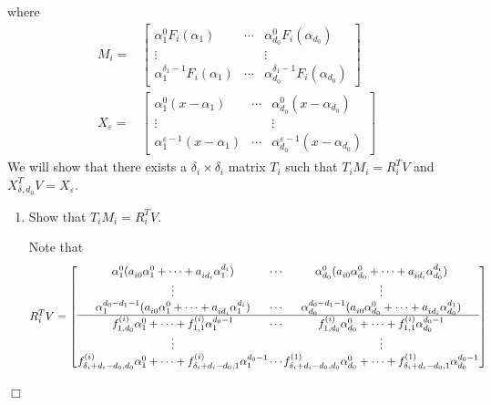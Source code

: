 \documentclass{article}
\newenvironment{proof}{\noindent{\em Proof:}}{$\Box$~\\}
\begin{document}
\begin{proof}
where
\begin{align*}
M_i=&
\begin{bmatrix}
{\alpha _1^0{F_i}({\alpha _1})}& \cdots &{\alpha _{{d_0}}^0{F_i}({\alpha _{{d_0}}})}\\
 \vdots &  & \vdots \\
{\alpha _1^{{\delta _1} - 1}{F_i}({\alpha _1})}& \cdots &{\alpha _{{d_0}}^{{\delta _1} - 1}{F_i}({\alpha _{{d_0}}})}
\end{bmatrix}\\
X_{\varepsilon}=&
\begin{bmatrix}
{\alpha _1^0(x - {\alpha _1})}& \cdots &{\alpha _{{d_0}}^0(x - {\alpha _{{d_0}}})}\\
 \vdots &  & \vdots \\
{\alpha _1^{\varepsilon  - 1}(x - {\alpha _1})}& \cdots &{\alpha _{{d_0}}^{\varepsilon  - 1}(x - {\alpha _{{d_0}}})}
\end{bmatrix}
\end{align*}
We will show that there exists a $\delta_i\times \delta_i$ matrix $T_i$ such that $T_iM_i=R_i^TV$ and
$X_{\delta,d_0}^TV=X_{\varepsilon}$.

\begin{enumerate}
\item Show that $T_iM_i=R_i^TV$.

Note that
{\scriptsize
\[
R_i^TV
\setlength{\arraycolsep}{0.5pt}
= \left[ {\begin{array}{*{20}{c}}
{\alpha _1^0(a_{i0}^{}\alpha _1^0 +  \cdots  + a_{i{d_i}}^{}\alpha _1^{{d_i}})}& \cdots &{\alpha _{{d_0}}^0(a_{i0}^{}\alpha _{{d_0}}^0 +  \cdots  + a_{i{d_i}}^{}\alpha _{{d_0}}^{{d_i}})}\\
 \vdots &{}& \vdots \\
{\alpha _1^{{d_0} - {d_1} - 1}(a_{i0}^{}\alpha _1^0 +  \cdots  + a_{i{d_i}}^{}\alpha _1^{{d_i}})}& \cdots &{\alpha _{{d_0}}^{{d_0} - {d_1} - 1}(a_{i0}^{}\alpha _{{d_0}}^0 +  \cdots  + a_{i{d_i}}^{}\alpha _{{d_0}}^{{d_1}})}\\
\hline
{f_{1,{d_0}}^{(i)}\alpha _1^0 +  \cdots  + f_{1,1}^{(i)}\alpha _1^{{d_0} - 1}}& \cdots &{f_{1,{d_0}}^{(i)}\alpha _{{d_0}}^0 +  \cdots  + f_{1,1}^{(i)}\alpha _{{d_0}}^{{d_0} - 1}}\\
 \vdots &{}& \vdots \\
{f_{{\delta _i} + {d_i} - {d_0},{d_0}}^{(i)}\alpha _1^0 +  \cdots  + f_{{\delta _i} + {d_i} - {d_0},1}^{(i)}\alpha _1^{{d_0} - 1}}& \cdots &{f_{{\delta _i} + {d_i} - {d_0},{d_0}}^{(1)}\alpha _{{d_0}}^0 +  \cdots  + f_{{\delta _i} + {d_i} - {d_0},1}^{(1)}\alpha _{{d_0}}^{{d_0} - 1}}
\end{array}} \right]
\]
}


\end{enumerate}
\end{proof}
\end{document}
